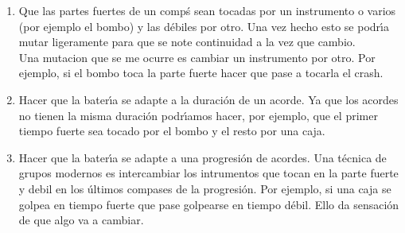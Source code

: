 \begin{enumerate}
\item Que las partes fuertes de un comp\'s sean tocadas por un instrumento o varios
(por ejemplo el bombo) y las d\'ebiles por otro. Una vez hecho esto se podr\'\i a
mutar ligeramente para que se note continuidad a la vez que cambio.\\ 
Una mutacion que se me ocurre es cambiar un instrumento por otro. Por ejemplo, 
si el bombo toca la parte fuerte hacer que pase a tocarla el crash.
\item Hacer que la bater\'\i a se adapte a la duraci\'on de un acorde. Ya que los
acordes no tienen la misma duraci\'on podr\'\i amos hacer, por ejemplo, que el primer
tiempo fuerte sea tocado por el bombo y el resto por una caja.
\item Hacer que la bater\'\i a se adapte a una progresi\'on de acordes. Una t\'ecnica 
de grupos modernos es intercambiar los intrumentos que tocan en la parte
fuerte y debil en los \'ultimos compases de la progresi\'on. Por ejemplo, 
si una caja se golpea en tiempo fuerte que 
pase golpearse en tiempo d\'ebil. Ello da sensaci\'on de que algo va a cambiar.
\end{enumerate}
